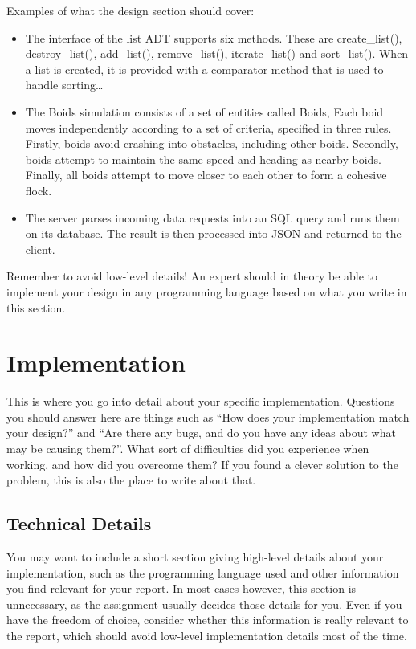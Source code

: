 \documentclass[conference]{IEEEtran}
\begin{document}
\bigskip

Examples of what the design section should cover:

\begin{itemize}
	\item The interface of the list ADT supports six methods. These are create\_list(), destroy\_list(), add\_list(), remove\_list(), iterate\_list() and sort\_list(). When a list is created, it is provided with a comparator method that is used to handle sorting{\dots}
	\item The Boids simulation consists of a set of entities called Boids, Each boid moves independently according to a set of criteria, specified in three rules. Firstly, boids avoid crashing into obstacles, including other boids. Secondly, boids attempt to maintain the same speed and heading as nearby boids. Finally, all boids attempt to move closer to each other to form a cohesive flock.
	\item The server parses incoming data requests into an SQL query and runs them on its database. The result is then processed into JSON and returned to the client.
\end{itemize}

\bigskip

Remember to avoid low-level details! An expert should in theory be able to implement your design in any programming language based on what you write in this section.

\section{Implementation}
\label{Section:Implementation}
This is where you go into detail about your specific implementation. Questions you should answer here are things such as ``How does your implementation match your design?'' and ``Are there any bugs, and do you have any ideas about what may be causing them?''. What sort of difficulties did you experience when working, and how did you overcome them? If you found a clever solution to the problem, this is also the place to write about that.

\subsection{Technical Details}
\label{Subsection:Technical_details}
You may want to include a short section giving high-level details about your implementation, such as the programming language used and other information you find relevant for your report. In most cases however, this section is unnecessary, as the assignment usually decides those details for you. Even if you have the freedom of choice, consider whether this information is really relevant to the report, which should avoid low-level implementation details most of the time.
\end{document}
